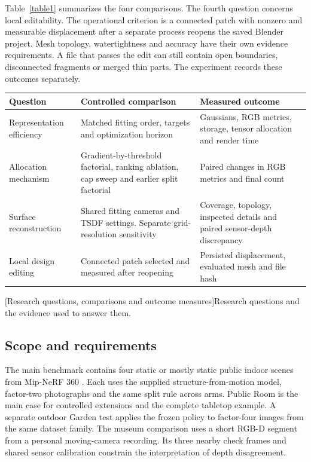 Table~\ref{table1} summarizes the four comparisons. The fourth question concerns local editability. The operational criterion is a connected patch with nonzero and measurable displacement after a separate process reopens the saved Blender project. Mesh topology, watertightness and accuracy have their own evidence requirements. A file that passes the edit can still contain open boundaries, disconnected fragments or merged thin parts. The experiment records these outcomes separately.

\begin{center}\begin{minipage}{\linewidth}
\small\begin{tabularx}{\linewidth}{@{}p{.24\linewidth}YY@{}}
\toprule
\textbf{Question} & \textbf{Controlled comparison} & \textbf{Measured outcome}\\
\midrule
Representation efficiency & Matched fitting order, targets and optimization horizon & Gaussians, RGB metrics, storage, tensor allocation and render time\\
Allocation mechanism & Gradient-by-threshold factorial, ranking ablation, cap sweep and earlier split factorial & Paired changes in RGB metrics and final count\\
Surface reconstruction & Shared fitting cameras and TSDF settings. Separate grid-resolution sensitivity & Coverage, topology, inspected details and paired sensor-depth discrepancy\\
Local design editing & Connected patch selected and measured after reopening & Persisted displacement, evaluated mesh and file hash\\
\bottomrule
\end{tabularx}\par
{}[Research questions, comparisons and outcome measures]{Research questions and the evidence used to answer them.}\label{table1}
\end{minipage}\end{center}

\subsection{Scope and requirements}
The main benchmark contains four static or mostly static public indoor scenes from Mip-NeRF 360 \cite{ref2}. Each uses the supplied structure-from-motion model, factor-two photographs and the same split rule across arms. Public Room is the main case for controlled extensions and the complete tabletop example. A separate outdoor Garden test applies the frozen policy to factor-four images from the same dataset family. The museum comparison uses a short RGB-D segment from a personal moving-camera recording. Its three nearby check frames and shared sensor calibration constrain the interpretation of depth disagreement.

